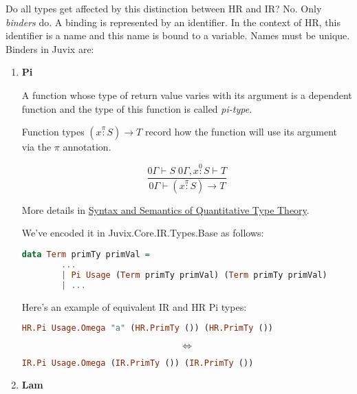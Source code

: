 \documentclass[acmsmall]{acmart}
\numberwithin{figure}{subsection}
\begin{document}
Do all types get affected by this distinction between HR and IR? No. Only \textit{binders} do. A binding is represented by an identifier. In the context of HR, this identifier is a name and this name is bound to a variable. Names must be unique. Binders in Juvix are:
\begin{enumerate}
    \item \textbf{Pi}


    A function whose type of return value varies with its argument is a dependent function and the type of this function is called \textit{pi-type}.
    
    Function types $(x \stackrel{\pi}{:} S) \rightarrow T$ record how the function will use its argument via the $\pi$ annotation.

    \begin{equation*}
       \dfrac{0\Gamma \vdash S \; 0 \Gamma, x \stackrel{0}{:} S \vdash T }{0 \Gamma \vdash (x \stackrel{\pi}{:} S) \rightarrow T} 
    \end{equation*}

    More details in \href{https://bentnib.org/quantitative-type-theory.pdf}{Syntax and Semantics of Quantitative Type Theory}.

    \bigskip

    We've encoded it in Juvix.Core.IR.Types.Base as follows:
    \begin{lstlisting}[language=haskell]
data Term primTy primVal = 
        ...
        | Pi Usage (Term primTy primVal) (Term primTy primVal)
        | ...
    \end{lstlisting}

    Here's an example of equivalent IR and HR Pi types:

    \begin{lstlisting}[language=haskell]
        HR.Pi Usage.Omega "a" (HR.PrimTy ()) (HR.PrimTy ())
    \end{lstlisting}
    \begin{equation*}
      \Leftrightarrow  
    \end{equation*}
    \begin{lstlisting}[language=haskell]
        IR.Pi Usage.Omega (IR.PrimTy ()) (IR.PrimTy ())
    \end{lstlisting}
    \item \textbf{Lam}


\end{enumerate}
\end{document}
